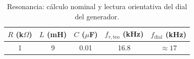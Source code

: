 \begin{table}[htbp]
\centering
\small
\setlength{\tabcolsep}{6pt}
\caption{Resonancia: cálculo nominal y lectura orientativa del dial del generador.}
\label{tab:rlc}
\begin{tabular}{ccccc}
\toprule
$R$ (k$\Omega$) & $L$ (mH) & $C$ ($\mu$F) & $f_{r,\mathrm{teo}}$ (kHz) & $f_{\mathrm{dial}}$ (kHz) \\
\midrule
1 & 9 & \num{0.01} & \num{16.8} & $\approx 17$ \\
\bottomrule
\end{tabular}
\end{table}
